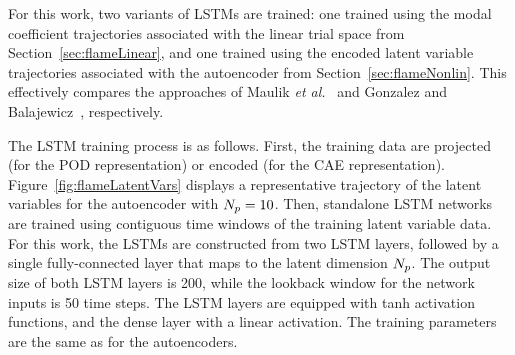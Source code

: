 For this work, two variants of LSTMs are trained: one trained using the modal coefficient trajectories associated with the linear trial space from Section~\ref{sec:flameLinear}, and one trained using the encoded latent variable trajectories associated with the autoencoder from Section~\ref{sec:flameNonlin}. This effectively compares the approaches of Maulik \textit{et al.}~\cite{Maulik2020} and Gonzalez and Balajewicz~\cite{Gonzalez2018}, respectively.

The LSTM training process is as follows. First, the training data are projected (for the POD representation) or encoded (for the CAE representation). Figure~\ref{fig:flameLatentVars} displays a representative trajectory of the latent variables for the autoencoder with $N_p = 10$. Then, standalone LSTM networks are trained using contiguous time windows of the training latent variable data. For this work, the LSTMs are constructed from two LSTM layers, followed by a single fully-connected layer that maps to the latent dimension $N_p$. The output size of both LSTM layers is 200, while the lookback window for the network inputs is 50 time steps. The LSTM layers are equipped with tanh activation functions, and the dense layer with a linear activation. The training parameters are the same as for the autoencoders. 

